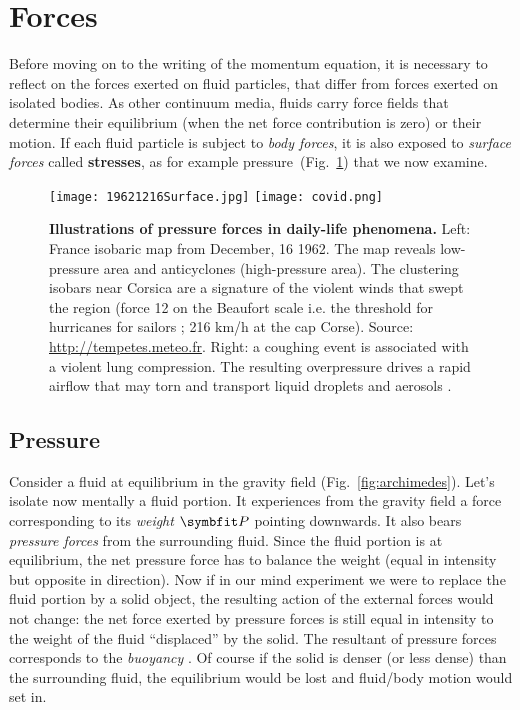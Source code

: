 \section{Forces}
Before moving on to the writing of the momentum equation, it is necessary to reflect on the forces exerted on fluid particles, that differ from forces exerted on isolated bodies.
As other continuum media, fluids carry force fields that determine their equilibrium (when the net force contribution is zero) or their motion. If each fluid particle is subject to \textit{body forces}, it is also exposed to \textit{surface forces} called \textbf{stresses}, as for example pressure~(Fig.~\ref{fig:weather_map}) that we now examine.
\begin{figure}[htbp]
\begin{center}
\texttt{[image: 19621216Surface.jpg]}
\texttt{[image: covid.png]} %
\caption{\textbf{Illustrations of pressure forces in daily-life phenomena.} Left: France isobaric map from December, 16 1962. The map reveals low-pressure area and anticyclones (high-pressure area). The clustering isobars near Corsica are a signature of the violent winds that swept the region (force 12 on the Beaufort scale i.e. the threshold for hurricanes for sailors ; 216 km/h at the cap Corse). Source: \url{http://tempetes.meteo.fr}. Right: a coughing event is associated with a violent lung compression. The resulting overpressure drives a rapid airflow that may torn and transport liquid droplets and aerosols \citep{Mittal2020}.}
\label{fig:weather_map}
\end{center}
\end{figure}

\subsection{Pressure}
 Consider a fluid at equilibrium in the gravity field (Fig.~\ref{fig:archimedes}). Let's isolate now mentally a fluid portion. It experiences from the gravity field a force corresponding to its \textit{weight}  $\bP$ pointing downwards. It also bears \textit{pressure forces} from the surrounding fluid. Since the fluid portion is at equilibrium, the net pressure force has to balance the weight (equal in intensity but opposite in direction). Now if in our mind experiment we were to replace the fluid portion by a solid object, the resulting action of the external forces would not change: the net force exerted by pressure forces is still equal in intensity to the weight of the fluid ``displaced'' by the solid. The resultant of pressure forces corresponds to the \textit{buoyancy} \citep{Lighthill1986}. Of course if the solid is denser (or less dense) than the surrounding fluid, the equilibrium would be lost and fluid/body motion would set in.

